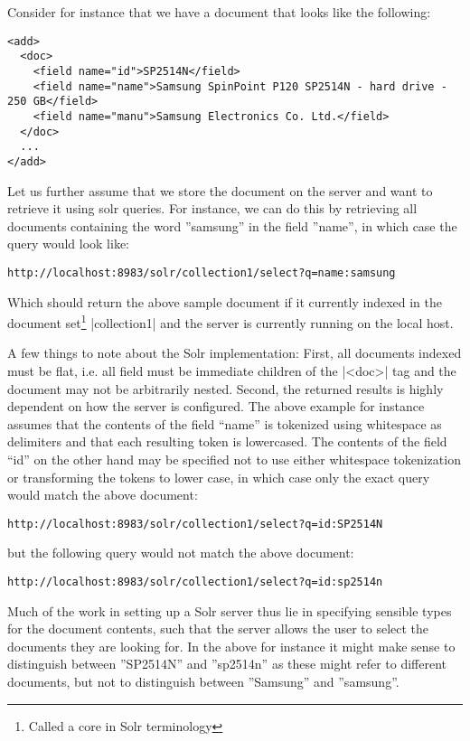 Consider for instance that we have a document that looks like the following:

\begin{verbatim}
<add>
  <doc>
    <field name="id">SP2514N</field>
    <field name="name">Samsung SpinPoint P120 SP2514N - hard drive - 250 GB</field>
    <field name="manu">Samsung Electronics Co. Ltd.</field>
  </doc>
  ...
</add>
\end{verbatim}

Let us further assume that we store the document on the server and want to retrieve it using solr queries. For instance, we can do this by retrieving all documents containing the word ''samsung'' in the field ''name'', in which case the query would look like:

\begin{verbatim}
http://localhost:8983/solr/collection1/select?q=name:samsung
\end{verbatim}

Which should return the above sample document if it currently indexed in the document set\footnote{Called a core in Solr terminology} |collection1| and the server is currently running on the local host.

A few things to note about the Solr implementation: First, all documents indexed must be flat, i.e. all  field must be immediate children of the |<doc>| tag and the document may not be arbitrarily nested. Second, the returned results is highly dependent on how the server is configured. The above example for instance assumes that the contents of the field “name” is tokenized using whitespace as delimiters and that each resulting token is lowercased. The contents of the field “id” on the other hand may be specified not to use either whitespace tokenization or transforming the tokens to lower case, in which case only the exact query would match the above document:

\begin{verbatim}
http://localhost:8983/solr/collection1/select?q=id:SP2514N
\end{verbatim}

but the following query would not match the above document:

\begin{verbatim}
http://localhost:8983/solr/collection1/select?q=id:sp2514n
\end{verbatim}

Much of the work in setting up a Solr server thus lie in specifying sensible types for the document contents, such that the server allows the user to select the documents they are looking for. In the above for instance it might make sense to distinguish between ''SP2514N'' and ''sp2514n'' as these might refer to different documents, but not to distinguish between ''Samsung'' and ''samsung''.

